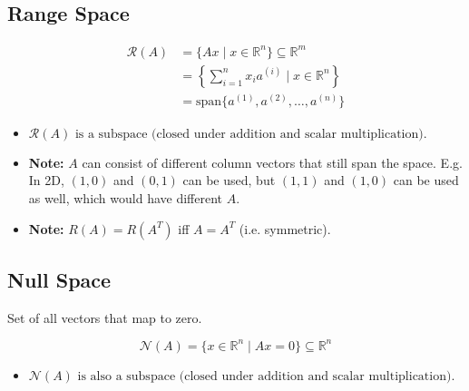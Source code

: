 \subsection{Range Space}
    \begin{definition}
        \begin{align}
            \mathcal{R}(A) &= \{Ax \mid x \in \mathbb{R}^n\} \subseteq \mathbb{R}^m \\
            &= \left\{ \sum_{i=1}^{n} x_i a^{(i)} \mid x \in \mathbb{R}^n \right\} \\ 
            &= \text{span} \{a^{(1)}, a^{(2)}, \dots, a^{(n)}\}
        \end{align}
        \begin{itemize}
            \item $\mathcal{R}(A) \text{ is a subspace (closed under addition and scalar multiplication).}$
            \item \textbf{Note:} $A$ can consist of different column vectors that still span the space. E.g. In 2D, $(1,0)$ and $(0,1)$ can be used, but $(1,1)$ and $(1,0)$ can be used as well, which would have different $A$. 
            \item \textbf{Note:} $R(A) = R(A^T)$ iff $A=A^T$ (i.e. symmetric).
        \end{itemize}

    \end{definition}

\subsection{Null Space}
    \begin{definition} 
    Set of all vectors that map to zero.

    \begin{equation}
        \mathcal{N}(A) = \{x \in \mathbb{R}^n \mid Ax = 0\} \subseteq \mathbb{R}^n
    \end{equation}

    \begin{itemize}
        \item $\mathcal{N}(A) \text{ is also a subspace (closed under addition and scalar multiplication).}$
    \end{itemize}
    \end{definition}

